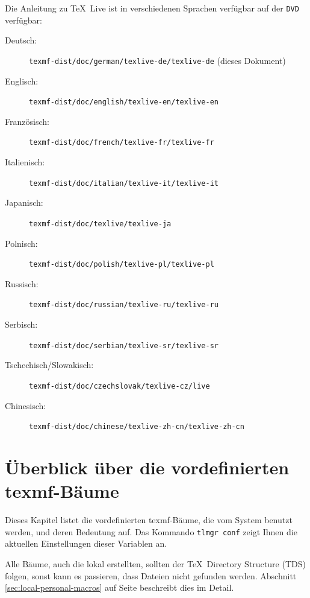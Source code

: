 \documentclass[12pt,ngerman,a4paper,fullparskip]{report}
\newcommand{\TL}{\TeX\ Live\xspace}
\newcommand{\acro}[1]{\texttt{#1}}
\newcommand{\OnCD}[1]{\texttt{#1}}
\providecommand*{\DVD}{\acro{DVD}\xspace}
\begin{document}
Die Anleitung zu \TL ist in verschiedenen Sprachen verfügbar auf der \DVD verfügbar:
\begin{description}
\item[Deutsch:]                \OnCD{texmf-dist/doc/german/texlive-de/texlive-de} (dieses Dokument)
\item[Englisch:]               \OnCD{texmf-dist/doc/english/texlive-en/texlive-en}
\item[Französisch:]            \OnCD{texmf-dist/doc/french/texlive-fr/texlive-fr}
\item[Italienisch:]              \OnCD{texmf-dist/doc/italian/texlive-it/texlive-it}
\item[Japanisch:]  					\OnCD{texmf-dist/doc/texlive/texlive-ja}
\item[Polnisch:]               \OnCD{texmf-dist/doc/polish/texlive-pl/texlive-pl}
\item[Russisch:]               \OnCD{texmf-dist/doc/russian/texlive-ru/texlive-ru}
\item[Serbisch:]               \OnCD{texmf-dist/doc/serbian/texlive-sr/texlive-sr}
\item[Tschechisch/Slowakisch:] \OnCD{texmf-dist/doc/czechslovak/texlive-cz/live}
\item[Chinesisch:]             \OnCD{texmf-dist/doc/chinese/texlive-zh-cn/texlive-zh-cn}
\end{description}

\section{Überblick über die vordefinierten texmf-Bäume}\label{sec:texmftrees}

Dieses Kapitel listet die vordefinierten texmf-Bäume, die vom System benutzt
werden, und deren Bedeutung auf. Das Kommando \texttt{tlmgr~conf}
zeigt Ihnen die aktuellen Einstellungen dieser Variablen an.

Alle Bäume, auch die lokal erstellten, sollten der \TeX\ Directory Structure (TDS) folgen, sonst kann es passieren, dass Dateien nicht gefunden werden. Abschnitt \ref{sec:local-personal-macros} auf Seite \pageref{sec:local-personal-macros} beschreibt dies im Detail.
\end{document}
